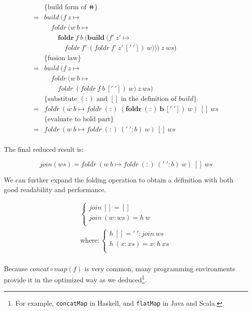 \documentclass{article}
\begin{document}
\begin{example}
\[\begin{array}{rl}
  & \{\text{build form of } \doubleplus \} \\
= & build\ (f\ z \mapsto \\
  & \quad foldr\ (w\ b \mapsto \\
  & \quad \quad \pmb{foldr}\ f\ b\ (\pmb{build}\ (f'\ z' \mapsto \\
  & \quad \quad \quad foldr\ f'\ (foldr\ f'\ z'\ ['\ '])\ w)))\ z\ ws) \\

  & \{\text{fusion law}\} \\
= & build\ (f\ z \mapsto \\
  & \quad foldr\ (w\ b \mapsto \\
  & \quad \quad foldr\ (foldr\ f\ b\ ['\ '])\ w)\ z\ ws) \\

  & \{\text{substitute $(:)$ and $[]$ in the definition of $build$}\} \\
= & foldr\ (w\ b \mapsto foldr\ (:)\ \pmb{(foldr\ (:)\ b\ ['\ '])}\ w)\ []\ ws \\

  & \{\text{evaluate to bold part}\} \\
= & foldr\ (w\ b \mapsto foldr\ (:)\ ('\ ' : b)\ w)\ []\ ws \\
\end{array} \]

The final reduced result is:

\[
join(ws) = foldr\ (w\ b \mapsto foldr\ (:)\ ('\ ' : b)\ w)\ []\ ws
\]

We can further expand the folding operation to obtain a definition with both good readability and performance.

\[
\begin{array}{l}
\begin{cases}
join\ [] = [] \\
join\ (w:ws) = h\ w \\
\end{cases} \\
\text{where}: \begin{cases}
             h\ [] = '\ ' : join\ ws \\
             h\ (x:xs) = x : h\ xs \\
             \end{cases} \\
\end{array}
\]

 
Because $concat \circ map(f)$ is very common, many programming environments provide it in the optimized way as we deduced\footnote{For example, \texttt{concatMap} in Haskell, and \texttt{flatMap} in Java and Scala.}.
\end{example}
\end{document}
